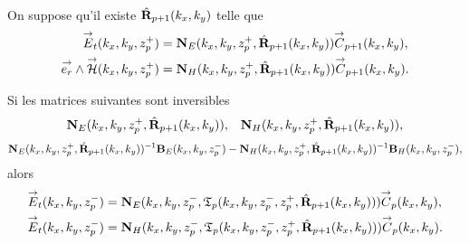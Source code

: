     \begin{prop}%
      \label{prop:plan:transfert:reflexion}{}~

      On suppose qu'il existe \(\hat{\mathbf{R}}_{p+1}(k_x,k_y)\) telle que 
      \begin{align*}
        {\overset{\rightarrow}{E}}_t(k_x,k_y,z_p^+) &= \mathbf{N}_{E}(k_x,k_y,z_p^+,\hat{\mathbf{R}}_{p+1}(k_x,k_y)){\overset{\rightarrow}{C}}_{p+1}(k_x,k_y),
        \\
        {\overset{\rightarrow}{e_r}}\wedge{\overset{\rightarrow}{\mathcal{H}}}(k_x,k_y,z_p^+) &= \mathbf{N}_{H}(k_x,k_y,z_p^+,\hat{\mathbf{R}}_{p+1}(k_x,k_y)){\overset{\rightarrow}{C}}_{p+1}(k_x,k_y).
      \end{align*}

      Si les matrices suivantes sont inversibles
      \begin{align*}
        \mathbf{N}_{E}(k_x,k_y,z_p^+,\hat{\mathbf{R}}_{p+1}(k_x,k_y)), && \mathbf{N}_{H}(k_x,k_y,z_p^+,\hat{\mathbf{R}}_{p+1}(k_x,k_y)),
      \end{align*}
      \begin{align*}
        \mathbf{N}_{E}(k_x,k_y,z_p^+,\hat{\mathbf{R}}_{p+1}(k_x,k_y))^{-1}\mathbf{B}_{E}(k_x,k_y,z_p^-) - \mathbf{N}_{H}(k_x,k_y,z_p^+,\hat{\mathbf{R}}_{p+1}(k_x,k_y))^{-1}\mathbf{B}_{H}(k_x,k_y,z_p^-),
      \end{align*}
      alors
      \begin{align*}
        {\overset{\rightarrow}{E}}_t(k_x,k_y,z_p^-) &= \mathbf{N}_{E}(k_x,k_y,z_p^-,\mathfrak{T}_p(k_x,k_y,z_p^-,z_p^+,\hat{\mathbf{R}}_{p+1}(k_x,k_y))){\overset{\rightarrow}{C}}_{p}(k_x,k_y),
        \\
        {\overset{\rightarrow}{E}}_t(k_x,k_y,z_p^-) &= \mathbf{N}_{H}(k_x,k_y,z_p^-,\mathfrak{T}_p(k_x,k_y,z_p^-,z_p^+,\hat{\mathbf{R}}_{p+1}(k_x,k_y))){\overset{\rightarrow}{C}}_{p}(k_x,k_y).
      \end{align*}
    \end{prop}


